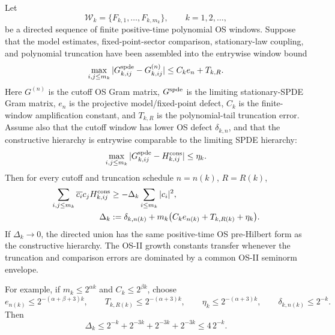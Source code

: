 \begin{proposition}
\label{prop:spde-finite-rate-assembly-schedule}
Let
\[
  \mathcal W_k=\{F_{k,1},\ldots,F_{k,m_k}\},
  \qquad k=1,2,\ldots,
\]
be a directed sequence of finite positive-time polynomial OS windows.  Suppose
that the model estimates, fixed-point-sector comparison, stationary-law
coupling, and polynomial truncation have been assembled into the entrywise
window bound
\begin{equation}
  \max_{i,j\leq m_k}|G_{k,ij}^{\rm spde}-G_{k,ij}^{(n)}|
  \leq C_k e_n+T_{k,R}.
  \label{eq:spde-finite-rate-entrywise-assembly}
\end{equation}
Here \(G^{(n)}\) is the cutoff OS Gram matrix, \(G^{\rm spde}\) is the limiting
stationary-SPDE Gram matrix, \(e_n\) is the projective model/fixed-point
defect, \(C_k\) is the finite-window amplification constant, and \(T_{k,R}\)
is the polynomial-tail truncation error.  Assume also that the cutoff window
has lower OS defect \(\delta_{k,n}\), and that the constructive hierarchy is
entrywise comparable to the limiting SPDE hierarchy:
\begin{equation}
  \max_{i,j\leq m_k}|G_{k,ij}^{\rm spde}-H_{k,ij}^{\rm cons}|
  \leq \eta_k.
  \label{eq:spde-finite-rate-constructive-entrywise}
\end{equation}
Then for every cutoff and truncation schedule \(n=n(k)\), \(R=R(k)\),
\begin{equation}
\begin{aligned}
  \sum_{i,j\leq m_k}\overline{c_i}c_jH_{k,ij}^{\rm cons}
  &\geq -\Delta_k\sum_{i\leq m_k}|c_i|^2,\\
  \Delta_k &:=
  \delta_{k,n(k)}
  +m_k\bigl(C_k e_{n(k)}+T_{k,R(k)}+\eta_k\bigr).
\end{aligned}
  \label{eq:spde-finite-rate-assembly-defect}
\end{equation}
If \(\Delta_k\to0\), the directed union has the same positive-time OS
pre-Hilbert form as the constructive hierarchy.  The OS-II growth constants
transfer whenever the truncation and comparison errors are dominated by a
common OS-II seminorm envelope.

For example, if \(m_k\leq2^{\alpha k}\) and \(C_k\leq2^{\beta k}\), choose
\[
  e_{n(k)}\leq2^{-(\alpha+\beta+3)k},\qquad
  T_{k,R(k)}\leq2^{-(\alpha+3)k},\qquad
  \eta_k\leq2^{-(\alpha+3)k},\qquad
  \delta_{k,n(k)}\leq2^{-k}.
\]
Then
\[
  \Delta_k
  \leq
  2^{-k}+2^{-3k}+2^{-3k}+2^{-3k}
  \leq 4\,2^{-k}.
\]
\end{proposition}


